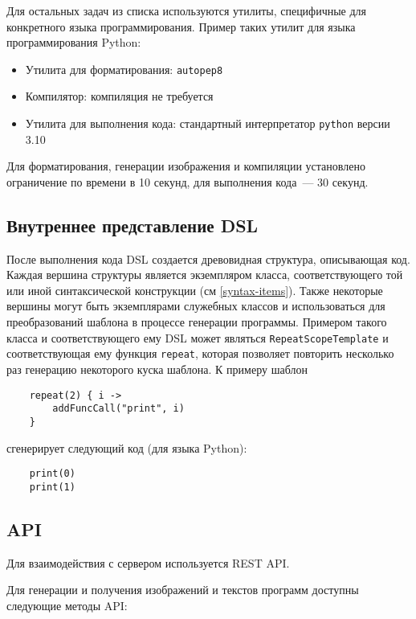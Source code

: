 Для остальных задач из списка используются утилиты, специфичные для конкретного языка программирования.
Пример таких утилит для языка программирования Python\cite{python}:

\begin{itemize}
    \item Утилита для форматирования: \texttt{autopep8}\cite{autopep8}
    \item Компилятор: компиляция не требуется
    \item Утилита для выполнения кода: стандартный интерпретатор \texttt{python} версии 3.10
\end{itemize}

Для форматирования, генерации изображения и компиляции установлено ограничение по времени в 10 секунд,
для выполнения кода~--- 30 секунд.

\subsection{Внутреннее представление DSL}
\label{dsl-classes}

После выполнения кода DSL создается древовидная структура, описывающая код.
Каждая вершина структуры является экземпляром класса, соответствующего той или иной синтаксической
конструкции (см \ref{syntax-items}). Также некоторые вершины могут быть экземплярами
служебных классов и использоваться для преобразований шаблона в процессе генерации программы.
Примером такого класса и соответствующего ему DSL может являться \texttt{RepeatScopeTemplate} и
соответствующая ему функция \texttt{repeat}, которая позволяет повторить несколько раз генерацию
некоторого куска шаблона. К примеру шаблон
\begin{verbatim}
    repeat(2) { i ->
        addFuncCall("print", i)
    }
\end{verbatim}

сгенерирует следующий код (для языка Python):

\begin{verbatim}
    print(0)
    print(1)    
\end{verbatim}

\subsection{API}
Для взаимодействия с сервером используется REST API.

Для генерации и получения изображений и текстов программ доступны следующие методы API:


